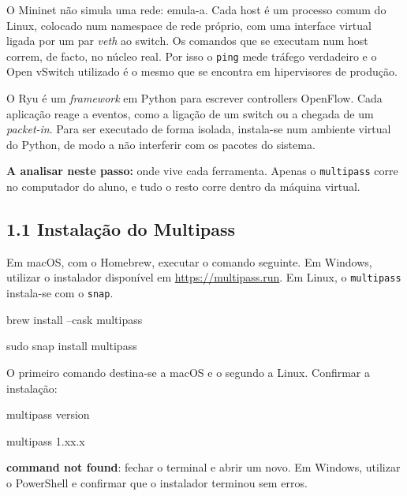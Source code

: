 \documentclass[11pt,a4paper]{article}
\newcommand{\cmd}[1]{\texttt{#1}}
\begin{document}
\begin{teoria}
O Mininet não simula uma rede: emula-a. Cada host é um processo comum do Linux, colocado num namespace de rede próprio, com uma interface virtual ligada por um par \emph{veth} ao switch. Os comandos que se executam num host correm, de facto, no núcleo real. Por isso o \cmd{ping} mede tráfego verdadeiro e o Open vSwitch utilizado é o mesmo que se encontra em hipervisores de produção.

O Ryu é um \emph{framework} em Python para escrever controllers OpenFlow. Cada aplicação reage a eventos, como a ligação de um switch ou a chegada de um \emph{packet-in}. Para ser executado de forma isolada, instala-se num ambiente virtual do Python, de modo a não interferir com os pacotes do sistema.

\textbf{A analisar neste passo:} onde vive cada ferramenta. Apenas o \cmd{multipass} corre no computador do aluno, e tudo o resto corre dentro da máquina virtual.
\end{teoria}

\subsection*{1.1 Instalação do Multipass}

Em macOS, com o Homebrew, executar o comando seguinte. Em Windows, utilizar o instalador disponível em \url{https://multipass.run}. Em Linux, o \cmd{multipass} instala-se com o \cmd{snap}.

\begin{terminal}
brew install --cask multipass
\end{terminal}

\begin{terminal}
sudo snap install multipass
\end{terminal}

O primeiro comando destina-se a macOS e o segundo a Linux. Confirmar a instalação:

\begin{terminal}
multipass version
\end{terminal}

\begin{saida}
multipass   1.xx.x
\end{saida}

\begin{erro}
\textbf{command not found}: fechar o terminal e abrir um novo. Em Windows, utilizar o PowerShell e confirmar que o instalador terminou sem erros.
\end{erro}
\end{document}
